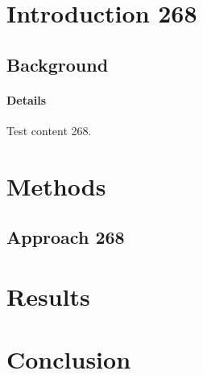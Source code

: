 \documentclass{article}
\begin{document}
\section{Introduction 268}
\subsection{Background}
\paragraph{Details} Test content 268.
\section{Methods}
\subsection{Approach 268}
\section{Results}
\section{Conclusion}
\end{document}
